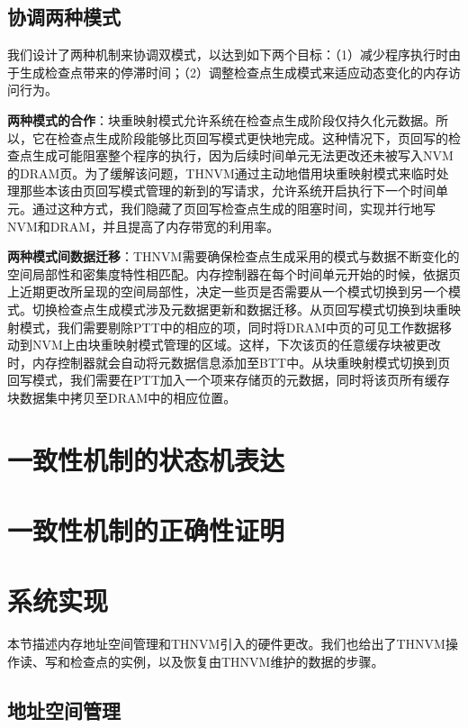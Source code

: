 \subsection{协调两种模式}
\label{subsec:coordination}

我们设计了两种机制来协调双模式，以达到如下两个目标：（1）减少程序执行时由于生成检查点带来的停滞时间；（2）调整检查点生成模式来适应动态变化的内存访问行为。

\textbf{两种模式的合作}：块重映射模式允许系统在检查点生成阶段仅持久化元数据。所以，它在检查点生成阶段能够比页回写模式更快地完成。这种情况下，页回写的检查点生成可能阻塞整个程序的执行，因为后续时间单元无法更改还未被写入NVM的DRAM页。为了缓解该问题，THNVM通过主动地借用块重映射模式来临时处理那些本该由页回写模式管理的新到的写请求，允许系统开启执行下一个时间单元。通过这种方式，我们隐藏了页回写检查点生成的阻塞时间，实现并行地写NVM和DRAM，并且提高了内存带宽的利用率。

\textbf{两种模式间数据迁移}：THNVM需要确保检查点生成采用的模式与数据不断变化的空间局部性和密集度特性相匹配。内存控制器在每个时间单元开始的时候，依据页上近期更改所呈现的空间局部性，决定一些页是否需要从一个模式切换到另一个模式。切换检查点生成模式涉及元数据更新和数据迁移。从页回写模式切换到块重映射模式，我们需要剔除PTT中的相应的项，同时将DRAM中页的可见工作数据移动到NVM上由块重映射模式管理的区域。这样，下次该页的任意缓存块被更改时，内存控制器就会自动将元数据信息添加至BTT中。从块重映射模式切换到页回写模式，我们需要在PTT加入一个项来存储页的元数据，同时将该页所有缓存块数据集中拷贝至DRAM中的相应位置。

\section{一致性机制的状态机表达}

\section{一致性机制的正确性证明}

\section{系统实现}
\label{sec:implementation}

本节描述内存地址空间管理和THNVM引入的硬件更改。我们也给出了THNVM操作读、写和检查点的实例，以及恢复由THNVM维护的数据的步骤。

\subsection{地址空间管理}
\label{subsec:thnvm-space}

